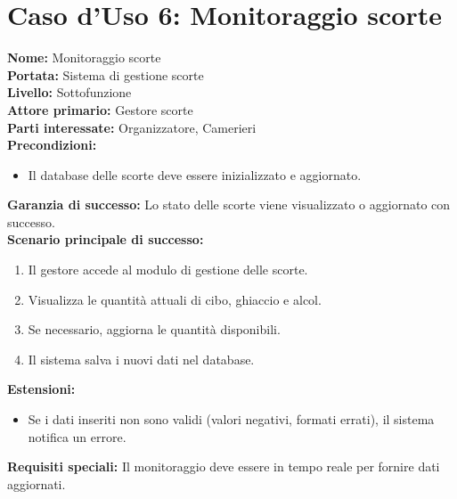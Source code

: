 \documentclass[a4paper,12pt]{article}
\begin{document}
\section*{\textcolor{sectioncolor}{Caso d'Uso 6: Monitoraggio scorte}}
\textcolor{textcolor}{
\textbf{Nome:} Monitoraggio scorte\\
\textbf{Portata:} Sistema di gestione scorte\\
\textbf{Livello:} Sottofunzione\\
\textbf{Attore primario:} Gestore scorte\\
\textbf{Parti interessate:} Organizzatore, Camerieri\\
\textbf{Precondizioni:}
\begin{itemize}
    \item Il database delle scorte deve essere inizializzato e aggiornato.
\end{itemize}
\textbf{Garanzia di successo:} Lo stato delle scorte viene visualizzato o aggiornato con successo.\\
\textbf{Scenario principale di successo:}
\begin{enumerate}
    \item Il gestore accede al modulo di gestione delle scorte.
    \item Visualizza le quantità attuali di cibo, ghiaccio e alcol.
    \item Se necessario, aggiorna le quantità disponibili.
    \item Il sistema salva i nuovi dati nel database.
\end{enumerate}
\textbf{Estensioni:}
\begin{itemize}
    \item  Se i dati inseriti non sono validi (valori negativi, formati errati), il sistema notifica un errore.
\end{itemize}
\textbf{Requisiti speciali:} Il monitoraggio deve essere in tempo reale per fornire dati aggiornati.
}
\end{document}
